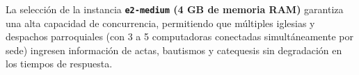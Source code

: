 \begin{nota}
La selección de la instancia \textbf{\texttt{e2-medium} (4 GB de memoria RAM)} garantiza una alta capacidad de concurrencia, permitiendo que múltiples iglesias y despachos parroquiales (con 3 a 5 computadoras conectadas simultáneamente por sede) ingresen información de actas, bautismos y catequesis sin degradación en los tiempos de respuesta.
\end{nota}
